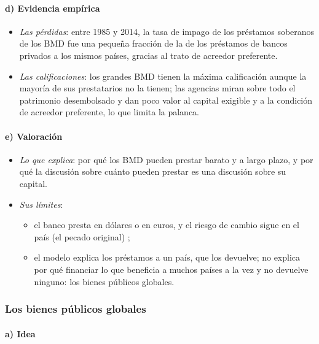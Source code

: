 \documentclass[11pt]{article}
\begin{document}
\paragraph{d) Evidencia empírica}

\begin{itemize}
\item \emph{Las pérdidas}: entre 1985 y 2014, la tasa de impago de los préstamos soberanos de los BMD fue una pequeña fracción de la de los préstamos de bancos privados a los mismos países, gracias al trato de acreedor preferente\nocite{PerraudinPowellYang2016}.
\item \emph{Las calificaciones}: los grandes BMD tienen la máxima calificación aunque la mayoría de sus prestatarios no la tienen; las agencias miran sobre todo el patrimonio desembolsado y dan poco valor al capital exigible y a la condición de acreedor preferente, lo que limita la palanca\nocite{Humphrey2017Piper}.
\end{itemize}

\paragraph{e) Valoración}

\begin{itemize}
\item \emph{Lo que explica}: por qué los BMD pueden prestar barato y a largo plazo, y por qué la discusión sobre cuánto pueden prestar es una discusión sobre su capital.
\item \emph{Sus límites}:
  \begin{itemize}
  \item el banco presta en dólares o en euros, y el riesgo de cambio sigue en el país (el pecado original) ;
  \item el modelo explica los préstamos a un país, que los devuelve; no explica por qué financiar lo que beneficia a muchos países a la vez y no devuelve ninguno: los bienes públicos globales.
  \end{itemize}
\end{itemize}

\subsubsection{Los bienes públicos globales}\label{sec:bpg}

\paragraph{a) Idea}
\end{document}

